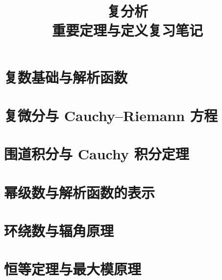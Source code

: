 \documentclass[12pt,a4paper]{article}
\title{\textbf{复分析\\重要定理与定义复习笔记}}
\author{}
\date{}
\begin{document}
\maketitle
\tableofcontents
\newpage

\section{复数基础与解析函数}


\section{复微分与 Cauchy--Riemann 方程}


\section{围道积分与 Cauchy 积分定理}


\section{幂级数与解析函数的表示}


\section{环绕数与辐角原理}


\section{恒等定理与最大模原理}

\end{document}
